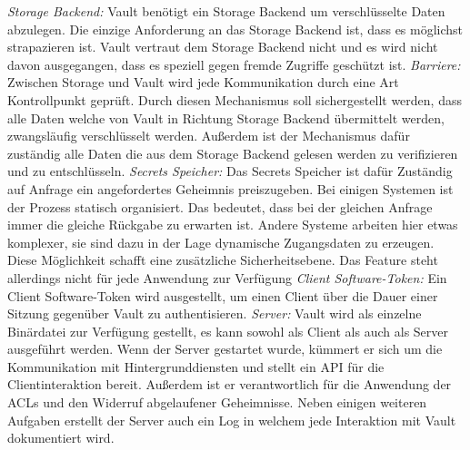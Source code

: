 \documentclass[
book,
a4paper,   
titlepage,  
halfparskip,
12pt        
]{scrartcl}
\begin{document}
\begin{onehalfspacing}
\textit{Storage Backend:} Vault benötigt ein Storage Backend um verschlüsselte Daten abzulegen. Die einzige Anforderung an das Storage Backend ist, dass es möglichst strapazieren ist. Vault vertraut dem Storage Backend nicht und es wird nicht davon ausgegangen, dass es speziell gegen fremde Zugriffe geschützt ist. 
\newline\textit{Barriere:} Zwischen Storage und Vault wird jede Kommunikation durch eine Art Kontrollpunkt geprüft. Durch diesen Mechanismus soll sichergestellt werden, dass alle Daten welche von Vault in Richtung Storage Backend übermittelt werden, zwangsläufig verschlüsselt werden. Außerdem ist der Mechanismus dafür zuständig alle Daten die aus dem Storage Backend gelesen werden zu verifizieren und zu entschlüsseln. 
\newline\textit{Secrets Speicher:} Das Secrets Speicher ist dafür Zuständig auf Anfrage ein angefordertes Geheimnis preiszugeben. Bei einigen Systemen ist der Prozess statisch organisiert. Das bedeutet, dass bei der gleichen Anfrage immer die gleiche Rückgabe zu erwarten ist. Andere Systeme arbeiten hier etwas komplexer, sie sind dazu in der Lage dynamische Zugangsdaten zu erzeugen. Diese Möglichkeit schafft eine zusätzliche Sicherheitsebene. Das Feature steht allerdings nicht für jede Anwendung zur Verfügung
\newline\textit{Client Software-Token:} Ein Client Software-Token wird ausgestellt, um einen Client über die Dauer einer Sitzung gegenüber Vault zu authentisieren.
\newline\textit{Server:} Vault wird als einzelne Binärdatei zur Verfügung gestellt, es kann sowohl als Client als auch als Server ausgeführt werden. Wenn der Server gestartet wurde, kümmert er sich um die Kommunikation mit Hintergrunddiensten und stellt ein \acs{API} für die Clientinteraktion bereit. Außerdem ist er verantwortlich für die Anwendung der \ac{ACL}s und den Widerruf abgelaufener Geheimnisse. Neben einigen weiteren Aufgaben erstellt der Server auch ein Log in welchem jede Interaktion mit Vault dokumentiert wird. 


\end{onehalfspacing}
\end{document}
